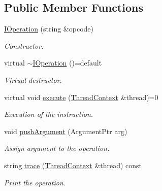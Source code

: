 \subsection*{Public Member Functions}
\begin{DoxyCompactItemize}
\item 
\mbox{\hyperlink{struct_evm_1_1_operation_1_1_i_operation_a65e98ee1b1679e12c1d1dd000ebfe937}{I\+Operation}} (string \&opcode)
\begin{DoxyCompactList}\small\item\em Constructor. \end{DoxyCompactList}\item 
\mbox{\label{struct_evm_1_1_operation_1_1_i_operation_a8a06e5afa77ea47b23728c642e7c39df}} 
virtual \mbox{\hyperlink{struct_evm_1_1_operation_1_1_i_operation_a8a06e5afa77ea47b23728c642e7c39df}{$\sim$\+I\+Operation}} ()=default
\begin{DoxyCompactList}\small\item\em Virtual destructor. \end{DoxyCompactList}\item 
virtual void \mbox{\hyperlink{struct_evm_1_1_operation_1_1_i_operation_a7285631335da103423c01471dedeb1d7}{execute}} (\mbox{\hyperlink{struct_evm_1_1_thread_context}{Thread\+Context}} \&thread)=0
\begin{DoxyCompactList}\small\item\em Execution of the instruction. \end{DoxyCompactList}\item 
void \mbox{\hyperlink{struct_evm_1_1_operation_1_1_i_operation_a800d9e3986654525f7674d8a7e534fa8}{push\+Argument}} (Argument\+Ptr arg)
\begin{DoxyCompactList}\small\item\em Assign argument to the operation. \end{DoxyCompactList}\item 
string \mbox{\hyperlink{struct_evm_1_1_operation_1_1_i_operation_a32fef14914757a5c2312595810f363d1}{trace}} (\mbox{\hyperlink{struct_evm_1_1_thread_context}{Thread\+Context}} \&thread) const
\begin{DoxyCompactList}\small\item\em Print the operation. \end{DoxyCompactList}\end{DoxyCompactItemize}
